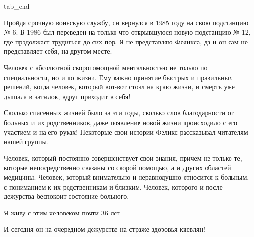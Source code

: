   tab_end
\fi

Пройдя срочную воинскую службу, он вернулся в 1985 году на свою подстанцию № 6.
В 1986 был переведен на только что открывшуюся новую подстанцию № 12, где
продолжает трудиться до сих пор. Я не представляю Феликса, да и он сам не
представляет себя, на другом месте. 

Человек с абсолютной скоропомощной ментальностью не только по специальности, но
и по жизни. Ему важно принятие быстрых и правильных решений, когда человек,
который вот-вот стоял на краю жизни, и смерть уже дышала в затылок, вдруг
приходит в себя!

Сколько спасенных жизней было за эти годы, сколько слов благодарности от
больных и их родственников, даже появление новой жизни происходило с его
участием и на его руках! Некоторые свои истории Феликс рассказывал читателям
нашей группы.

Человек, который постоянно совершенствует свои знания, причем не только те,
которые непосредственно связаны со скорой помощью, а и других областей
медицины. Человек, который внимательно и неравнодушно относится к больным, с
пониманием к их родственникам и близким. Человек, которого и после дежурства
беспокоит состояние больного. 

Я живу с этим человеком почти 36 лет.

И сегодня он на очередном дежурстве на страже здоровья киевлян!
